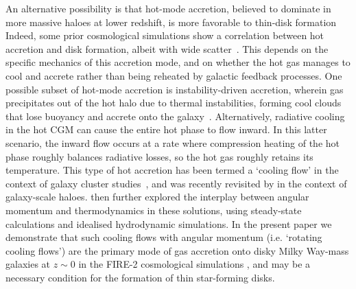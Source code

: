 \documentclass[fleqn,usenatbib]{mnras}
\begin{document}
An alternative possibility is that hot-mode accretion, believed to dominate in more massive haloes at lower redshift, is more favorable to thin-disk formation
Indeed, some prior cosmological simulations show a correlation between hot accretion and disk formation, albeit with wide scatter~\citep{Sales2012}.
This depends on the specific mechanics of this accretion mode, and on whether the hot gas manages to cool and accrete rather than being reheated by galactic feedback processes.
One possible subset of hot-mode accretion is instability-driven accretion, wherein gas precipitates out of the hot halo due to thermal instabilities, forming cool clouds that lose buoyancy and accrete onto the galaxy~\citep[e.g.][]{Maller2004, Mccourt2012, Voit2015, Armillotta2016, Gronke2020b,Fielding2020, Voit2021}.
Alternatively, radiative cooling in the hot CGM can cause the entire hot phase to flow inward.
In this latter scenario, the inward flow occurs at a rate where compression heating of the hot phase roughly balances radiative losses, so the hot gas roughly retains its temperature.
This type of hot accretion has been termed a `cooling flow' in the context of galaxy cluster studies~\citep[][see \citealt{McNamara2007} for a review]{Mathews1978, Cowie1980, Fabian1984, Balbus1988, Bertschinger1989}, and was recently revisited by \cite{Stern2019} in the context of galaxy-scale haloes.
\cite{Stern2020} then further explored the interplay between angular momentum and thermodynamics in these solutions, using steady-state calculations and idealised hydrodynamic simulations. 
In the present paper we demonstrate that such cooling flows with angular momentum (i.e. `rotating cooling flows')
are the primary mode of gas accretion onto disky Milky Way-mass galaxies at $z \sim 0$ in the FIRE-2 cosmological simulations \citep{Hopkins2018}, and may be a necessary condition for the formation of thin star-forming disks.
\end{document}
